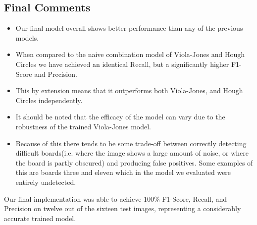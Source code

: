 \documentclass[conference]{IEEEtran}
\begin{document}
\subsection{Final Comments}
\begin{itemize}
	\item Our final model overall shows better performance than any of the previous models. 
	
	\item When compared to the naive combination model of Viola-Jones and Hough Circles we have achieved an identical Recall, but a significantly higher F1-Score and Precision.
	
	\item This by extension means that it outperforms both Viola-Jones, and Hough Circles independently. 
	
	\item It should be noted that the efficacy of the model can vary due to the robustness of the trained Viola-Jones model.
	
	\item Because of this there tends to be some trade-off between correctly detecting difficult boards(i.e. where the image shows a large amount of noise, or where the board is partly obscured) and producing false positives. Some examples of this are boards three and eleven which in the model we evaluated were entirely undetected.
	
\end{itemize}

Our final implementation was able to achieve 100\% F1-Score, Recall, and Precision on twelve out of the sixteen test images, representing a considerably accurate trained model.
\end{document}
